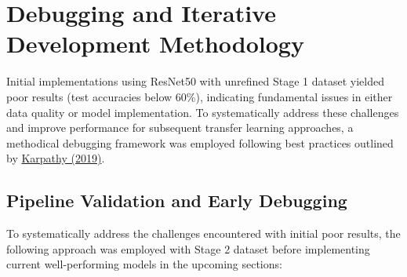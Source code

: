 \documentclass[a4paper,12pt]{report}
\begin{document}





\section{Debugging and Iterative Development Methodology}

Initial implementations using ResNet50 with unrefined Stage 1 dataset yielded poor results (test accuracies below 60\%), indicating fundamental issues in either data quality or model implementation. To systematically address these challenges and improve performance for subsequent transfer learning approaches, a methodical debugging framework was employed following best practices outlined by \href{https://karpathy.github.io/2019/04/25/recipe/}{Karpathy (2019)}.

\subsection{Pipeline Validation and Early Debugging}

To systematically address the challenges encountered with initial poor results, the following approach was employed with Stage 2 dataset before implementing current well-performing models in the upcoming sections:
\end{document}
